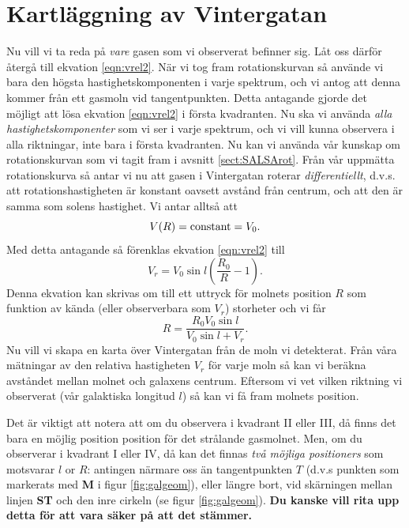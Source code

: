 \section{Kartläggning av Vintergatan}
\label{sect:map}
Nu vill vi ta reda på {\em vare} gasen som vi observerat befinner sig.  Låt oss
därför återgå till ekvation \ref{eqn:vrel2}.  När vi tog fram rotationskurvan
så använde vi bara den högsta hastighetskomponenten i varje spektrum, och vi
antog att denna kommer från ett gasmoln vid tangentpunkten.  Detta antagande
gjorde det möjligt att lösa ekvation \ref{eqn:vrel2} i första kvadranten.  Nu
ska vi använda {\em alla hastighetskomponenter} som vi ser i varje spektrum,
och vi vill kunna observera i alla riktningar, inte bara i första kvadranten. 
Nu kan vi använda vår kunskap om rotationskurvan som vi tagit fram i avsnitt \ref{sect:SALSArot}.
Från vår uppmätta rotationskurva så antar vi nu att gasen i Vintergatan 
roterar {\em differentiellt}, d.v.s. att rotationshastigheten är konstant 
oavsett avstånd från centrum, och att den är samma som solens hastighet. Vi 
antar alltså att 
\begin{equation}
	V(R) = {\rm constant} = V_0.
\end{equation}
Med detta antagande så förenklas ekvation \ref{eqn:vrel2} till 
\begin{equation}
V_r = V_0\sin l \left( \frac{R_0}{R} -1 \right).
\end{equation}
Denna ekvation kan skrivas om till ett uttryck för molnets position $R$ 
som funktion av kända (eller observerbara som $V_r$) storheter och vi får 
\begin{equation}
\boxed{
R = \frac{R_0 V_0 \sin l}{V_0 \sin l + V_r}.
}
\label{eqn:Rmap}
\end{equation}
Nu vill vi skapa en karta över Vintergatan från de moln vi detekterat.
Från våra mätningar av den relativa hastigheten $V_r$ för varje moln
så kan vi beräkna avståndet mellan molnet och galaxens centrum. Eftersom
vi vet vilken riktning vi observerat (vår galaktiska longitud $l$) så 
kan vi få fram molnets position.

Det är viktigt att notera att om du observera i kvadrant II eller III, 
då finns det bara en möjlig position position för det strålande gasmolnet.
Men, om du observerar i kvadrant I eller IV, då kan det finnas {\em två möjliga positioners} 
som motsvarar $l$ or $R$: antingen närmare oss än tangentpunkten $T$ (d.v.s punkten
som markerats med {\bf M} i figur \ref{fig:galgeom}), eller längre bort, vid skärningen 
mellan linjen {\bf ST} och den inre cirkeln (se figur \ref{fig:galgeom}). 
{\bf Du kanske vill rita upp detta för att vara säker på att det stämmer.}

